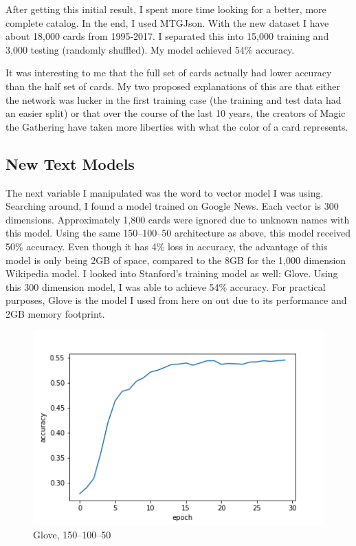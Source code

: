 After getting this initial result, I spent more time looking for
a better, more complete catalog. In the end, I used MTGJson\cite{mtgjson}.
With the new dataset I have about 18,000 cards from 1995-2017. 
I separated this into 15,000 training and 3,000 testing (randomly shuffled).
My model achieved 54\% accuracy.

It was interesting to me that the full set of cards actually had lower accuracy
than the half set of cards. My two proposed explanations of this are that
either the network was lucker in the first training case (the training and test
data had an easier split) or that over the course of the last 10 years, the 
creators of Magic the Gathering have taken more liberties with what the color
of a card represents.

\subsection{New Text Models}
The next variable I manipulated was the word to vector model I was using.
Searching around, I found a model trained on Google News. Each vector is 300
dimensions. Approximately 1,800 cards were ignored due to unknown names with 
this model. Using the same 150--100--50 architecture as above, this model
received 50\% accuracy. Even though it has 4\% loss in accuracy, the 
advantage of this model is only being 2GB of space, compared to the 8GB
for the 1,000 dimension Wikipedia model. I looked into Stanford's 
training model as well: Glove\cite{pennington2014glove}.
Using this 300 dimension model, I was able to achieve 54\% accuracy. 
For practical purposes, Glove is the model I used from here on out due 
to its performance and 2GB memory footprint.

\begin{figure}[h!]
    \centering
    \includegraphics[width=0.9\linewidth]{figures/glove_color.png}
    \caption{Glove, 150--100--50}
    \label{fig:glove_color}
\end{figure}
